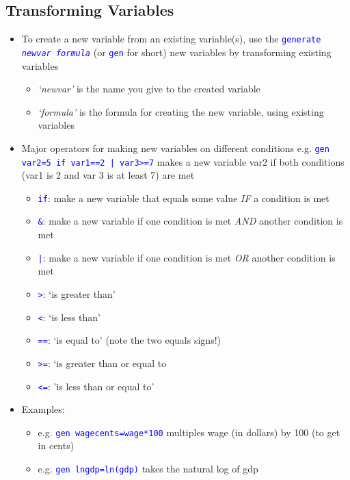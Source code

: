 \documentclass{article}
\begin{document}
\subsection{Transforming Variables}
	\begin{itemize}
			\item To create a new variable from an existing variable(s), use the \textcolor{blue}{\texttt{generate \emph{newvar} \emph{formula}}} (or \textcolor{blue}{\texttt{gen}} for short) new variables by transforming existing variables
			\begin{itemize}
				\item \emph{`newvar'} is the name you give to the created variable
				\item \emph{`formula'} is the formula for creating the new variable, using existing variables	
			\end{itemize}
		\item Major operators for making new variables on different conditions e.g. \textcolor{blue}{\texttt{gen var2=5 if var1==2 | var3>=7}} makes a new variable var2 if both conditions (var1 is 2 and var 3 is at least 7) are met 
		\begin{itemize}
			\item \textcolor{blue}{\texttt{if}}: make a new variable that equals some value \emph{IF} a condition is met
			\item \textcolor{blue}{\texttt{&}}: make a new variable if one condition is met \emph{AND} another condition is met
			\item \textcolor{blue}{\texttt{|}}: make a new variable if one condition is met \emph{OR} another condition is met
			\item \textcolor{blue}{\texttt{>}}: `is greater than'
			\item \textcolor{blue}{\texttt{<}}: `is less than'
			\item \textcolor{blue}{\texttt{==}}: `is equal to' (note the two equals signs!) 
			\item \textcolor{blue}{\texttt{>=}}: `is greater than or equal to
			\item \textcolor{blue}{\texttt{<=}}: 'is less than or equal to'
		\end{itemize}
		\item Examples: 
		\begin{itemize}
			\item e.g. \textcolor{blue}{\texttt{gen wagecents=wage*100}} multiples wage (in dollars) by 100 (to get in cents) 
			\item e.g. \textcolor{blue}{\texttt{gen lngdp=ln(gdp)}} takes the natural log of gdp

\end{itemize}
\end{itemize}
\end{document}
